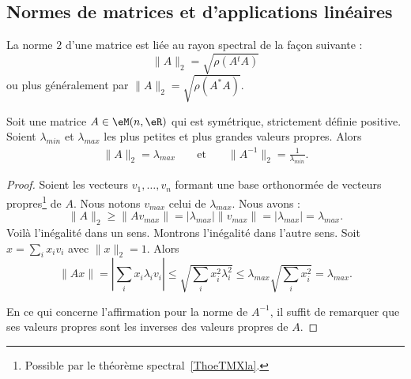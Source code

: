 \subsection{Normes de matrices et d'applications linéaires}

\begin{theorem}       \label{THOooNDQSooOUWQrK}
	La norme \( 2\) d'une matrice est liée au rayon spectral de la façon suivante :
	\begin{equation}
		\|A\|_2=\sqrt{\rho(A{^t}A)}
	\end{equation}
	ou plus généralement par \( \| A \|_2=\sqrt{\rho(A^*A)}\).
\end{theorem}

\begin{lemma}       \label{LEMooNESTooVvUEOv}
	Soit une matrice \( A\in \eM(n,\eR)\) qui est symétrique, strictement définie positive. Soient \( \lambda_{min}\) et \( \lambda_{max}\) les plus petites et plus grandes valeurs propres. Alors
	\begin{subequations}
		\begin{align}
			\| A \|_2=\lambda_{max} &  & \text{ et } &  & \|A^{-1}  \|_2=\frac{1}{ \lambda_{min} }.
		\end{align}
	\end{subequations}
\end{lemma}

\begin{proof}
	Soient les vecteurs \( v_1,\ldots, v_n\) formant une base orthonormée de vecteurs propres\footnote{Possible par le théorème spectral~\ref{ThoeTMXla}.} de \( A\). Nous notons \( v_{max}\) celui de \( \lambda_{max}\). Nous avons :
	\begin{equation}
		\| A \|_2\geq \| Av_{max} \|=| \lambda_{max} |\| v_{max} \|=| \lambda_{max} |=\lambda_{max}.
	\end{equation}
	Voilà l'inégalité dans un sens. Montrons l'inégalité dans l'autre sens. Soit \( x=\sum_ix_iv_i\) avec \( \| x \|_2=1\). Alors
	\begin{equation}
		\| Ax \|=\left| \sum_ix_i\lambda_iv_i \right|\leq\sqrt{ \sum_ix_i^2\lambda_i^2 }\leq \lambda_{max}\sqrt{ \sum_ix_i^2}=\lambda_{max}.
	\end{equation}

	En ce qui concerne l'affirmation pour la norme de \( A^{-1}\), il suffit de remarquer que ses valeurs propres sont les inverses des valeurs propres de \( A\).
\end{proof}


